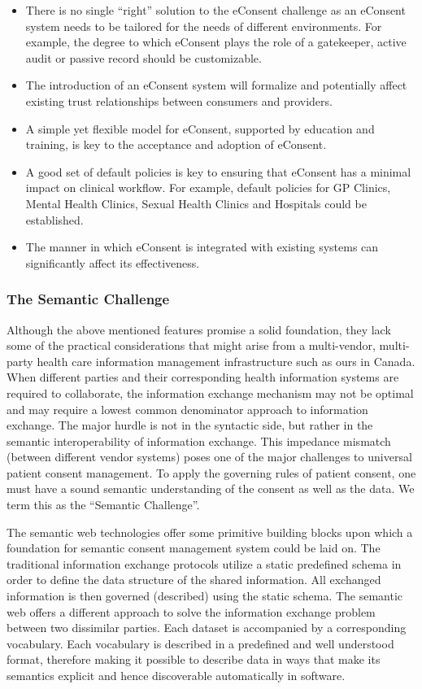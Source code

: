 \documentclass[conference]{IEEEtran}
\begin{document}
\begin{itemize}
 \item There is no single “right” solution to the eConsent challenge as an eConsent system needs to be tailored for the needs of different environments. For
example, the degree to which eConsent plays the role of a gatekeeper, active audit or passive record should be customizable. 
\item The introduction of an eConsent system will formalize and potentially affect existing trust relationships between consumers and providers. 
\item A simple yet flexible model for eConsent, supported by education and training, is key to the acceptance and adoption of eConsent. 
\item A good set of default policies is key to ensuring that eConsent has a minimal impact on clinical workflow. For example, default policies for GP Clinics,
Mental Health Clinics, Sexual Health Clinics and Hospitals could be established. 
\item The manner in which eConsent is integrated with existing systems can significantly affect its effectiveness. 
\end{itemize}

\subsubsection*{The Semantic Challenge}
Although the above mentioned features promise a solid foundation, they lack some of the practical considerations that might arise from a multi-vendor,
multi-party health care information management infrastructure such as ours in Canada.  When different parties and their corresponding health information systems
are required to collaborate, the information exchange mechanism may not be optimal and may require a lowest common denominator approach to information
exchange. The major hurdle is not in the syntactic side, but rather in the semantic interoperability of information exchange.  This impedance mismatch (between
different vendor
systems) poses one of the major challenges to universal patient consent management. To apply the governing rules of patient consent, one must have a sound
semantic understanding of the consent as well as the data.  We term this as the “Semantic Challenge”.  

The semantic web technologies offer some primitive building blocks upon which a foundation for semantic consent management system could be laid on.  The
traditional information exchange protocols utilize a static predefined schema in order to define the data structure of the shared information. All exchanged
information is then governed (described) using the static schema.  The semantic web offers a different approach to solve the information exchange problem
between two dissimilar parties.  Each dataset is accompanied by a corresponding vocabulary.  Each vocabulary is described in a predefined and well understood
format, therefore making it possible to describe data in ways that make its semantics explicit and hence discoverable automatically in software.
\end{document}
